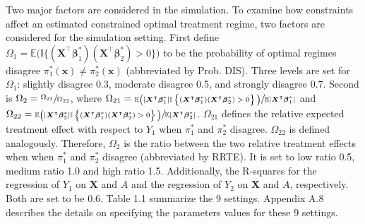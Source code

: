 \documentclass{article}
\newcommand{\itl}{\intercal}
\newcommand{\bs}{ \boldsymbol}
\newcommand{\mb}{\mathbb}
\newcommand{\lt}{\left}
\newcommand{\rt}{\right}
\begin{document}
Two major factors are considered in the simulation. To examine how constraints affect an estimated constrained optimal treatment regime, two factors are considered for the simulation setting. First define $\Omega_{1}= \mb{E}\big(\mb{I}\{(\bs{X}^{\itl}\bs{\beta}^*_1)(\bs{X}^{\itl}\bs{\beta}^{*}_{2}) > 0\}\big)$ to be the probability of optimal regimes disagree $\pi^{*}_{1}(\bs{x}) \ne \pi^{*}_{2}(\bs{x})$ (abbreviated by Prob. DIS). Three levels are set for $\Omega_{1}$: slightly disagree 0.3, moderate disagree 0.5, and strongly disagree 0.7. Second is $\Omega_2 = \sfrac{\Omega_{21}}{\Omega_{22}}$, where $\Omega_{21} = \sfrac{
\mb{E}\big(|\bs{X}^{\itl}\bs{\beta}^*_1|\mb{I}\lt\{(\bs{X}^{\itl}\bs{\beta}^*_1)(\bs{X}^{\itl}\bs{\beta}^{*}_{2})>0\rt\}\big)}{\mb{E}|\bs{X}^{\itl}\bs{\beta}^*_1|}$ and $\Omega_{22} = \sfrac{
\mb{E}\big(|\bs{X}^{\itl}\bs{\beta}^*_2|\mb{I}\lt\{(\bs{X}^{\itl}\bs{\beta}^*_1)(\bs{X}^{\itl}\bs{\beta}^{*}_{2})>0\rt\}\big)}{\mb{E}|\bs{X}^{\itl}\bs{\beta}^*_2|}$.  $\Omega_{21}$ defines the relative expected treatment effect with respect to $Y_1$ when $\pi^{*}_{1}$ and $\pi^{*}_{2}$ disagree. $\Omega_{22}$ is defined analogously. Therefore, $\Omega_{2}$ is the ratio between the two relative treatment effects when when $\pi^{*}_{1}$ and $\pi^{*}_{2}$ disagree (abbreviated by RRTE). It is set to low ratio 0.5, medium ratio 1.0 and high ratio 1.5. Additionally, the R-squares for the regression of $Y_1$ on $\bs{X}$ and $A$ and the regression of $Y_2$ on $\bs{X}$ and $A$, respectively. Both are set to be 0.6.  Table 1.1 summarize the 9 settings. Appendix A.8 describes the details on specifying the parameters values for these 9 settings. \\
\end{document}
